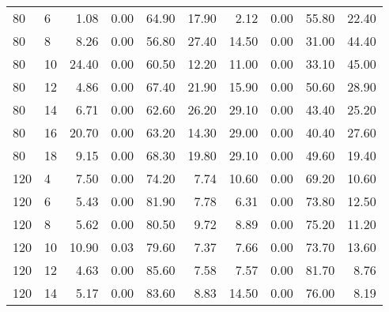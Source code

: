 \begin{table*}[h]
\begin{center}
\begin{tabular} {l l | r r r r | r r r r }
80   &             6   &  1.08   &            0.00             &               64.90  &  17.90  &  2.12   &            0.00             &               55.80  &  22.40  \\
80   &             8   &  8.26   &            0.00             &               56.80  &  27.40  &  14.50  &            0.00             &               31.00  &  44.40  \\
80   &             10  &  24.40  &            0.00             &               60.50  &  12.20  &  11.00  &            0.00             &               33.10  &  45.00  \\
80   &             12  &  4.86   &            0.00             &               67.40  &  21.90  &  15.90  &            0.00             &               50.60  &  28.90  \\
80   &             14  &  6.71   &            0.00             &               62.60  &  26.20  &  29.10  &            0.00             &               43.40  &  25.20  \\
80   &             16  &  20.70  &            0.00             &               63.20  &  14.30  &  29.00  &            0.00             &               40.40  &  27.60  \\
80   &             18  &  9.15   &            0.00             &               68.30  &  19.80  &  29.10  &            0.00             &               49.60  &  19.40  \\
120  &             4   &  7.50   &            0.00             &               74.20  &  7.74   &  10.60  &            0.00             &               69.20  &  10.60  \\
120  &             6   &  5.43   &            0.00             &               81.90  &  7.78   &  6.31   &            0.00             &               73.80  &  12.50  \\
120  &             8   &  5.62   &            0.00             &               80.50  &  9.72   &  8.89   &            0.00             &               75.20  &  11.20  \\
120  &             10  &  10.90  &            0.03             &               79.60  &  7.37   &  7.66   &            0.00             &               73.70  &  13.60  \\
120  &             12  &  4.63   &            0.00             &               85.60  &  7.58   &  7.57   &            0.00             &               81.70  &  8.76   \\
120  &             14  &  5.17   &            0.00             &               83.60  &  8.83   &  14.50  &            0.00             &               76.00  &  8.19   \\

\end{tabular}
\end{center}
\end{table*}
